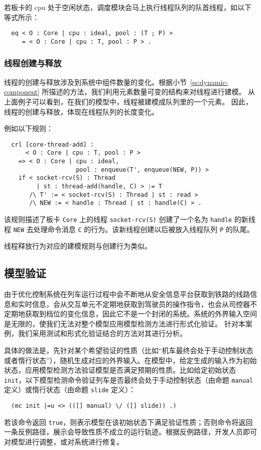 若板卡的 cpu 处于空闲状态，调度模块会马上执行线程队列的队首线程，如以下等式所示：
\begin{verbatim}
  eq < O : Core | cpu : ideal, pool : (T ; P) > 
     = < O : Core | cpu : T, pool : P > .
\end{verbatim}


\subsubsection{线程创建与释放}

线程的创建与释放涉及到系统中组件数量的变化。根据小节~\ref{ss:dynamic-component} 所描述的方法，我们利用元素数量可变的结构来对线程进行建模。
从上面例子可以看到，在我们的模型中，线程被建模成队列里的一个元素。
因此，线程的创建与释放，体现在线程队列的长度变化。

例如以下规则：
\begin{verbatim}
  crl [core-thread-add] :
      < O : Core | cpu : T, pool : P >
    => < O : Core | cpu : ideal, 
                    pool : enqueue(T', enqueue(NEW, P)) >
    if < socket-rcv(S) : Thread 
         | st : thread-add(handle, C) > := T
       /\ T' := < socket-rcv(S) : Thread | st : read >
       /\ NEW := < handle : Thread | st : handle(C) > . 
\end{verbatim}
该规则描述了板卡 \verb|Core| 上的线程 \verb|socket-rcv(S)| 创建了一个名为 \verb|handle| 的新线程 \verb|NEW| 去处理命令消息 \verb|C| 的行为。该新线程创建以后被放入线程队列 \verb|P| 的队尾。

线程释放行为对应的建模规则与创建行为类似。

\subsection{模型验证}

由于优化控制系统在列车运行过程中会不断地从安全信息平台获取到铁路的线路信息和实时信息，会从交互单元不定期地获取到驾驶员的操作指令，也会从司控器不定期地获取到档位的变化信息，因此它不是一个封闭的系统。系统的外界输入空间是无限的，使我们无法对整个模型应用模型检测方法进行形式化验证。
针对本案例，我们采用测试和形式化验证结合的方法对其进行分析。

具体的做法是，先针对某个希望验证的性质（比如“机车最终会处于手动控制状态或者惰行状态”），随机生成对应的外界输入。在模型中，给定生成的输入作为初始状态，应用模型检测方法验证模型是否满足预期的性质。比如给定初始状态 \verb|init|，以下模型检测命令验证列车是否最终会处于手动控制状态（由命题 \verb|manual| 定义）或惰行状态（由命题 \verb|slide| 定义）：
\begin{verbatim}
  (mc init |=u <> (([] manual) \/ ([] slide)) .)
\end{verbatim}
若该命令返回 \verb|true|，则表示模型在该初始状态下满足验证性质；否则命令将返回一条反例路径，展示会导致性质不成立的运行轨迹。根据反例路径，开发人员即可对模型进行调整，或对系统进行修复。


